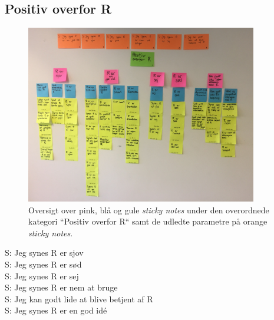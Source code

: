 \subsection{Positiv overfor R}
%
\begin{figure}[H]
\centering
\includegraphics[width = 0.9\textwidth]{Figure/AffinityDiagram/PositivOverforR} 
\caption{Oversigt over pink, blå og gule \textit{sticky notes} under den overordnede kategori ``Positiv overfor R`` samt de udledte parametre på orange \textit{sticky notes}.}
\label{fig:AFPositivOverforR}
\end{figure}
\noindent
%
S: Jeg synes R er sjov\\
S: Jeg synes R er sød\\
S: Jeg synes R er sej\\
S: Jeg synes R er nem at bruge\\
S: Jeg kan godt lide at blive betjent af R\\
S: Jeg synes R er en god idé

